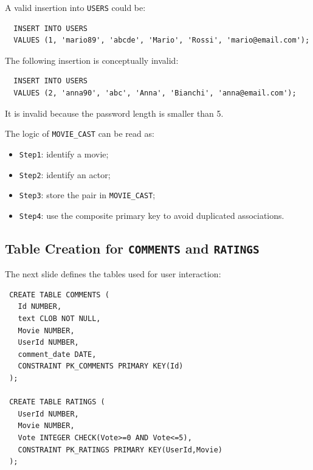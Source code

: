  \begin{example}
  A valid insertion into \texttt{USERS} could be:
  \begin{verbatim}
  INSERT INTO USERS
  VALUES (1, 'mario89', 'abcde', 'Mario', 'Rossi', 'mario@email.com');
  \end{verbatim}
  \vspace{-0.4cm}
 \end{example}

 \begin{example}
  The following insertion is conceptually invalid:
  \begin{verbatim}
  INSERT INTO USERS
  VALUES (2, 'anna90', 'abc', 'Anna', 'Bianchi', 'anna@email.com');
  \end{verbatim}
  \vspace{-0.4cm}

  It is invalid because the password length is smaller than 5.
 \end{example}

 \begin{example}
  The logic of \texttt{MOVIE\_CAST} can be read as:
  \begin{itemize}
   \item \texttt{Step1}: identify a movie;
   \vspace{0.2cm}
   \item \texttt{Step2}: identify an actor;
   \vspace{0.2cm}
   \item \texttt{Step3}: store the pair in \texttt{MOVIE\_CAST};
   \vspace{0.2cm}
   \item \texttt{Step4}: use the composite primary key to avoid duplicated associations.
  \end{itemize}
 \end{example}

 \subsection{Table Creation for \texttt{COMMENTS} and \texttt{RATINGS}}

 The next slide defines the tables used for user interaction:

 \begin{verbatim}
 CREATE TABLE COMMENTS (
   Id NUMBER,
   text CLOB NOT NULL,
   Movie NUMBER,
   UserId NUMBER,
   comment_date DATE,
   CONSTRAINT PK_COMMENTS PRIMARY KEY(Id)
 );

 CREATE TABLE RATINGS (
   UserId NUMBER,
   Movie NUMBER,
   Vote INTEGER CHECK(Vote>=0 AND Vote<=5),
   CONSTRAINT PK_RATINGS PRIMARY KEY(UserId,Movie)
 );
 \end{verbatim}
 \vspace{-0.4cm}

